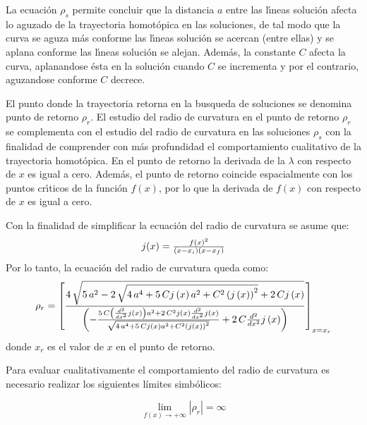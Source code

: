 \documentclass[conference,letterpaper,onecolumn]{IEEEtran}
\begin{document}
{La ecuaci\'on $\rho_{s}$ permite concluir que la distancia $a$ entre las l\'{\i}neas soluci\'on
afecta lo aguzado de la trayectoria homot\'opica en las soluciones, de tal modo
que la curva se aguza m\'as conforme las l\'{\i}neas soluci\'on se acercan (entre ellas) y se aplana
conforme las l\'{\i}neas soluci\'on se alejan. Adem\'as, la constante $C$ afecta
la curva, aplanandose \'esta en la soluci\'on cuando $C$ se incrementa y por
el contrario, aguzandose conforme $C$ decrece.


El punto donde la trayectoria retorna en la busqueda de soluciones se denomina
punto de retorno $\rho_r$. El estudio del radio de curvatura en el punto de retorno $\rho_r$
se complementa con el estudio del radio de curvatura en las soluciones $\rho_s$ con la finalidad
de comprender con m\'as profundidad el comportamiento cualitativo de la trayectoria homot\'opica.
En el punto de retorno la derivada de la $\lambda$ con respecto
de $x$ es igual a cero. Adem\'as,  el punto de retorno coincide espacialmente con los puntos cr\'{\i}ticos de la funci\'on
$f(x)$, por lo que la derivada de $f(x)$ con respecto de $x$ es igual a cero. 

Con la finalidad de simplificar la ecuaci\'on del radio de curvatura se asume que: 
\begin{displaymath}
\begin{array}{l}
 j(x)= {f(x)^2 \over (x-x_i)(x-x_f)}
\end{array}
\end{displaymath}
Por lo tanto, la ecuaci\'on del radio de curvatura queda como:
{
\begin{displaymath}
\rho_{r}=\left[{4\,\sqrt {5\,{a}^{2}- 2\,\sqrt {4\,{a}^{4}+ 5\,Cj \left( x
 \right) {a}^{2}+{C}^{2} \left( j \left( x \right)  \right) ^{2}}+ 2
\,Cj \left( x \right) } \over \left( -{\frac {5\,C \left( {\frac {d^{2}}{d{x
}^{2}}}j \left( x \right)  \right) {a}^{2}+2\,{C}^{2}j \left( x
 \right) {\frac {d^{2}}{d{x}^{2}}}j \left( x \right) }{\sqrt {4\,{a}^{
4}+5\,Cj \left( x \right) {a}^{2}+{C}^{2} \left( j \left( x \right) 
 \right) ^{2}}}}+2\,C{\frac {d^{2}}{d{x}^{2}}}j \left( x \right) 
 \right)} \right]_{x=x_r}
\end{displaymath}
}
donde $x_r$ es el valor de $x$ en el punto de retorno.




Para evaluar cualitativamente el comportamiento del radio de curvatura es necesario realizar los siguientes l{\'i}mites simb\'olicos:

\begin{equation}
 \displaystyle\lim_{f(x) \to{+}\infty}{|\rho_{r}|}=\infty
 \label{rcurv1}
\end{equation}

}
\end{document}
